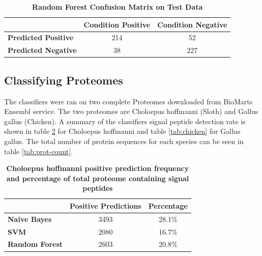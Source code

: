 \documentclass[10pt,letterpaper]{article}
\begin{document}
	\begin{table}[!ht]
		\centering
		\caption{{\bf Random Forest Confusion Matrix on Test Data}}
		\label{tab:conf-forest}
		\begin{tabular}{lcc}
			\hline
			& \multicolumn{1}{l}{\textbf{Condition Positive}} & \multicolumn{1}{l}{\textbf{Condition Negative}} \\ \hline
			\textbf{Predicted Positive} & 214                                             & 52                                              \\
			\textbf{Predicted Negative} & 38                                              & 227                                             \\ \hline
		\end{tabular}
	\end{table}
	
	\subsection*{Classifying Proteomes}
	The classifiers were ran on two complete Proteomes downloaded from BioMarts Ensembl service. The two proteomes are Choloepus hoffmanni (Sloth) and Gallus gallus (Chicken). A summary of the classifiers signal peptide detection rate is shown in table \ref{tab:sloth} for Choloepus hoffmanni and table \ref{tab:chicken} for Gallus gallus. The total number of protein sequences for each species can be seen in table \ref{tab:prot-count}.
	
	\begin{table}[!ht]
		\centering
		\caption{{\bf Choloepus hoffmanni positive prediction frequency and percentage of total proteome containing signal peptides}}
		\label{tab:sloth}
		\begin{tabular}{@{}lcc@{}}
			\toprule
			& \multicolumn{1}{l}{Positive Predictions} & \multicolumn{1}{l}{Percentage} \\ \midrule
			\textbf{Naive Bayes}   & 3493                                     & 28.1\%                         \\
			\textbf{SVM}           & 2080                                     & 16.7\%                         \\
			\textbf{Random Forest} & 2603                                     & 20.8\%                        
		\end{tabular}
	\end{table}
	
\end{document}
